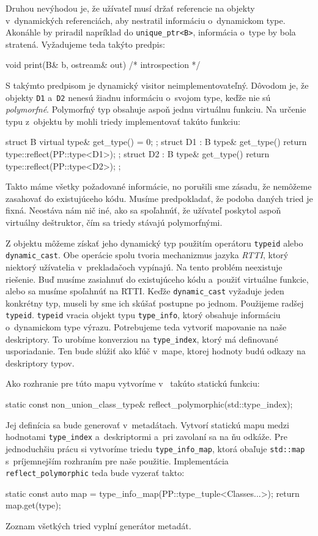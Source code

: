 Druhou nevýhodou je, že užívateľ musí držať referencie na objekty v~dynamických referenciách, aby nestratil informáciu o~dynamickom type. Akonáhle by priradil napríklad do \texttt{unique\_ptr<B>}, informácia o~type by bola stratená. Vyžadujeme teda takýto predpis:
\begin{code}
void print(B& b, ostream& out) { /* introspection */ }
\end{code}
S takýmto predpisom je dynamický visitor neimplementovateľný. Dôvodom je, že objekty \texttt{D1} a~\texttt{D2} nenesú žiadnu informáciu o~svojom type, keďže nie sú \emph{polymorfné}. Polymorfný typ obsahuje aspoň jednu virtuálnu funkciu. Na určenie typu z~objektu by mohli triedy implementovať takúto funkciu:
\begin{code}[fontsize=\footnotesize]
struct B { virtual type& get_type() = 0; };
struct D1 : B { type& get_type() { return type::reflect(PP::type<D1>); } };
struct D2 : B { type& get_type() { return type::reflect(PP::type<D2>); } };
\end{code}
Takto máme všetky požadované informácie, no porušili sme zásadu, že nemôžeme zasahovať do existujúceho kódu. Musíme predpokladať, že podoba daných tried je fixná. Neostáva nám nič iné, ako sa spoľahnúť, že užívateľ poskytol aspoň virtuálny deštruktor, čím sa triedy stávajú polymorfnými.

Z objektu môžeme získať jeho dynamický typ použitím operátoru \texttt{typeid} alebo \texttt{dynamic\_cast}. Obe operácie spolu tvoria mechanizmus jazyka \emph{RTTI}, ktorý niektorý užívatelia \Cpp{} v~prekladačoch vypínajú. Na tento problém neexistuje riešenie. Buď musíme zasiahnuť do existujúceho kódu a~použiť virtuálne funkcie, alebo sa musíme spoľahnúť na RTTI. Keďže \texttt{dynamic\_cast} vyžaduje jeden konkrétny typ, museli by sme ich skúšať postupne po jednom. Použijeme radšej \texttt{typeid}. \texttt{typeid} vracia objekt typu \texttt{type\_info}, ktorý obsahuje informáciu o~dynamickom type výrazu. Potrebujeme teda vytvoriť mapovanie na naše deskriptory. To urobíme konverziou na \texttt{type\_index}, ktorý má definované usporiadanie. Ten bude slúžiť ako kľúč v~mape, ktorej hodnoty budú odkazy na deskriptory typov.

Ako rozhranie pre túto mapu vytvoríme v~\PPreflection{} takúto statickú funkciu:
\begin{code}[fontsize=\footnotesize]
static const non_union_class_type& reflect_polymorphic(std::type_index);
\end{code}
Jej definícia sa bude generovať v~metadátach. Vytvorí statickú mapu medzi hodnotami \texttt{type\_index} a~deskriptormi a~pri zavolaní sa na ňu odkáže. Pre jednoduchšiu prácu si vytvoríme triedu \texttt{type\_info\_map}, ktorá obaľuje \texttt{std::map} s~príjemnejším rozhraním pre naše použitie. Implementácia \texttt{reflect\_polymorphic} teda bude vyzerať takto:
\begin{code}
static const auto map = type_info_map(PP::type_tuple<Classes...>);
return map.get(type);
\end{code}
Zoznam všetkých tried vyplní generátor metadát.

